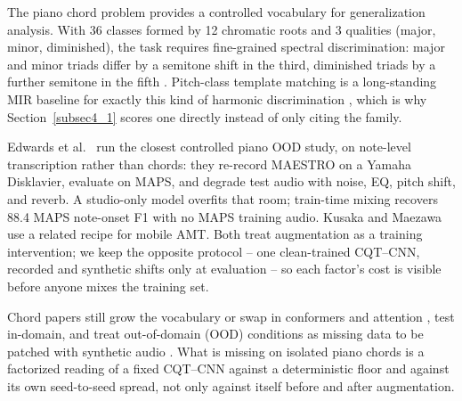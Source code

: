 \documentclass[pdflatex,sn-mathphys-num,iicol]{sn-jnl}
\theoremstyle{thmstyleone}
\theoremstyle{thmstyletwo}
\theoremstyle{thmstylethree}
\begin{document}
The piano chord problem provides a controlled vocabulary for generalization analysis. With 36 classes formed by 12 chromatic roots and 3 qualities (major, minor, diminished), the task requires fine-grained spectral discrimination: major and minor triads differ by a semitone shift in the third, diminished triads by a further semitone in the fifth \cite{Harte2010}. Pitch-class template matching is a long-standing MIR baseline for exactly this kind of harmonic discrimination \cite{Kamonsantiroj2024}\cite{Cui2022}\cite{Putra2025}\cite{Korzeniowski2016}, which is why Section~\ref{subsec4_1} scores one directly instead of only citing the family.

Edwards et al.\ \cite{Edwards2024} run the closest controlled piano OOD study, on note-level transcription rather than chords: they re-record MAESTRO on a Yamaha Disklavier, evaluate on MAPS, and degrade test audio with noise, EQ, pitch shift, and reverb. A studio-only model overfits that room; train-time mixing recovers 88.4 MAPS note-onset F1 with no MAPS training audio. Kusaka and Maezawa \cite{Kusaka2024} use a related recipe for mobile AMT. Both treat augmentation as a training intervention; we keep the opposite protocol -- one clean-trained CQT--CNN, recorded and synthetic shifts only at evaluation -- so each factor's cost is visible before anyone mixes the training set.

Chord papers still grow the vocabulary \cite{Majchrzak2025} or swap in conformers \cite{Akram2025} and attention \cite{Kusaka2024}, test in-domain, and treat out-of-domain (OOD) conditions as missing data to be patched with synthetic audio \cite{Byambatsogt2020}\cite{Ostermann2023}. What is missing on isolated piano chords is a factorized reading of a fixed CQT--CNN against a deterministic floor and against its own seed-to-seed spread, not only against itself before and after augmentation.
\end{document}
